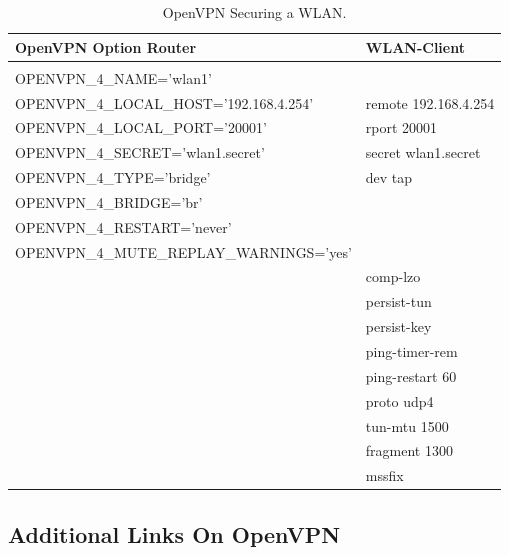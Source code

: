 \begin{table}[htbp]
  \begin{scriptsize}
    \begin{tabular}{ll}
      OpenVPN Option Router                         & WLAN-Client         \\
      \hline \\
      OPENVPN\_4\_NAME='wlan1'                      & ~ \\
      OPENVPN\_4\_LOCAL\_HOST='192.168.4.254'       & remote 192.168.4.254\\
      OPENVPN\_4\_LOCAL\_PORT='20001'               & rport 20001 \\
      OPENVPN\_4\_SECRET='wlan1.secret'             & secret wlan1.secret \\
      OPENVPN\_4\_TYPE='bridge'                     & dev tap\\
      OPENVPN\_4\_BRIDGE='br'                       & ~\\
      OPENVPN\_4\_RESTART='never'                   & ~\\
      OPENVPN\_4\_MUTE\_REPLAY\_WARNINGS='yes'      & ~\\
      ~                                             & comp-lzo \\
      ~                                             & persist-tun \\
      ~                                             & persist-key \\
      ~                                             & ping-timer-rem \\
      ~                                             & ping-restart 60 \\
      ~                                             & proto udp4 \\
      ~                                             & tun-mtu 1500 \\
      ~                                             & fragment 1300 \\
      ~                                             & mssfix \\
    \end{tabular}
  \end{scriptsize}
  \caption{OpenVPN Securing a WLAN.}
\end{table}

\subsection{Additional Links On OpenVPN}

